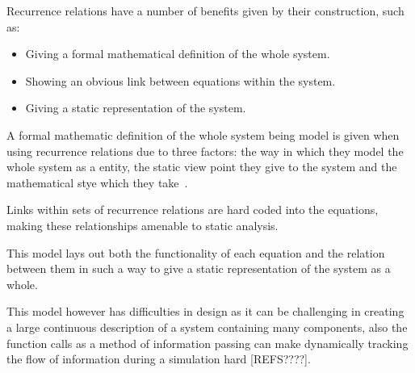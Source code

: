 \documentclass{article}
\begin{document}
Recurrence relations have a number of benefits given by their construction, such as:
\begin{itemize}
    \item Giving a formal mathematical definition of the whole system.
    \item Showing an obvious link between equations within the system.
    \item Giving a static representation of the system.
\end{itemize}

A formal mathematic definition of the whole system being model is given when using recurrence relations due to three factors: the way in which they model the whole system as a entity, the static view point they give to the system and the mathematical stye which they take~\cite{rrformulism}.  %

Links within sets of recurrence relations are hard coded into the equations, making these relationships amenable to static analysis.      

This model lays out both the functionality of each equation and the relation between them in such a way to give a static representation of the system as a whole. 

This model however has difficulties in design as it can be challenging in creating a large continuous description of a system containing many components, also the function calls as a method of information passing can make dynamically tracking the flow of information during a simulation hard [REFS????].   





\end{document}
